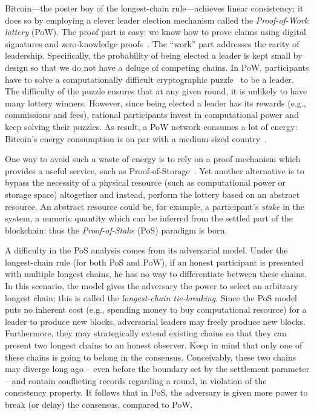 Bitcoin---the poster boy of the longest-chain rule---achieves 
linear consistency; it does so by employing a clever leader election mechanism 
called the \emph{Proof-of-Work lottery} (PoW). 
The proof part is easy: we know how to prove claims using 
digital signatures and zero-knowledge proofs~\cite {DigitalSignatures,ZK}. 
The ``work'' part addresses the rarity of leadership. 
Specifically, 
the probability of being elected a leader is kept small by design 
so that we do not have a deluge of competing chains. 
In PoW, participants have to solve a computationally difficult 
cryptographic puzzle~\cite{PoW} 
to be a leader. 
The difficulty of the puzzle ensures that at any given round, 
it is unlikely to have many lottery winners. 
However, since being elected a leader has its rewards (e.g., commissions and fees), 
rational participants invest in computational power 
and keep solving their puzzles. 
As result, a PoW network consumes a lot of energy: 
Bitcoin's energy consumption is 
on par with a medium-sized country~\cite{BitcoinEnergy}.

One way to avoid such a waste of energy 
is to rely on a proof mechanism which provides 
a useful service, such as Proof-of-Storage~\cite{ProofOfStorage}. 
Yet another alternative is to bypass the necessity of a physical resource 
(such as computational power or storage space)
altogether and instead, perform the lottery based on an abstract resource. 
An abstract resource could be, for example, 
a participant's \emph{stake} in the system, 
a numeric quantity which can be inferred 
from the settled part of the blockchain; 
thus the \emph{Proof-of-Stake} (PoS) paradigm is born.

A difficulty in the PoS analysis 
comes from its adversarial model. 
Under the longest-chain rule (for both PoS and PoW), 
if an honest participant 
is presented with multiple longest chains, 
he has no way to differentiate between these chains. 
In this scenario, the model gives the adversary the power to 
select an arbitrary longest chain; 
this is called the \emph{longest-chain tie-breaking}. 
Since the PoS model puts no inherent cost 
(e.g., spending money to buy computational resource) 
for a leader to produce new blocks, 
adversarial leaders may 
freely produce new blocks. 
Furthermore, they may strategically 
extend existing chains 
so that they can 
present two longest chains to an honest observer. 
Keep in mind that only one of these chains 
is going to belong in the consensus. 
Conceivably, these two chains may diverge 
long ago -- even before the boundary set by the settlement parameter -- and 
contain conflicting records regarding a round, 
in violation of the consistency property.  
It follows that in PoS, 
the adversary is given more power to 
break (or delay) the consensus, 
compared to PoW. 


